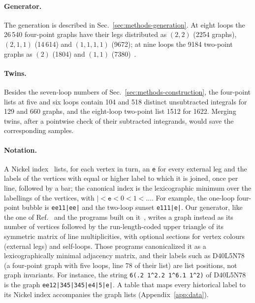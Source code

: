 \paragraph{Generator.}
The generation is described in Sec.~\ref{sec:methods-generation}. At eight loops the
26\,540 four-point graphs have their legs distributed as $(2,2)$ (2254 graphs), $(2,1,1)$ (14\,614) and $(1,1,1,1)$
(9672); at nine loops the 9184 two-point graphs as $(2)$ (1804) and $(1,1)$ (7380)~.

\paragraph{Twins.}
Besides the seven-loop numbers of Sec.~\ref{sec:methods-construction}, the four-point lists at five and six loops contain
104 and 518 distinct unsubtracted integrals for 129 and 660 graphs, and the eight-loop two-point list 1512 for 1622.
Merging twins, after a pointwise check of their subtracted integrands, would save the corresponding samples.

\paragraph{Notation.}
A Nickel index~\cite{NMB1977} lists, for each vertex in turn, an \texttt{e} for every external leg and the labels of the
vertices with equal or higher label to which it is joined, once per line, followed by a bar; the canonical index is the
lexicographic minimum over the labellings of the vertices, with $|<\texttt{e}<0<1<\dots$. For example, the one-loop
four-point bubble is \texttt{ee11|ee|} and the two-loop sunset \texttt{e111|e|}. Our generator, like the one of
Ref.~\cite{Ribeca2003thesis} and the programs built on it~\cite{GuidaRibeca2006}, writes a graph instead as its number
of vertices followed by the run-length-coded upper triangle of its symmetric matrix of line multiplicities, with
optional sections for vertex colours (external legs) and self-loops. Those programs canonicalized it as a
lexicographically minimal adjacency matrix, and their labels such as D40L5N78 (a four-point graph with five loops,
line 78 of their list) are list positions, not graph invariants. For instance, the string \texttt{6(.2 1\^{}2.2 1\^{}6.1 1\^{}2)} of D40L5N78
is the graph \texttt{ee12|345|345|e4|5|e|}. A table that maps every historical label to its Nickel index accompanies
the graph lists (Appendix~\ref{app:data}).

